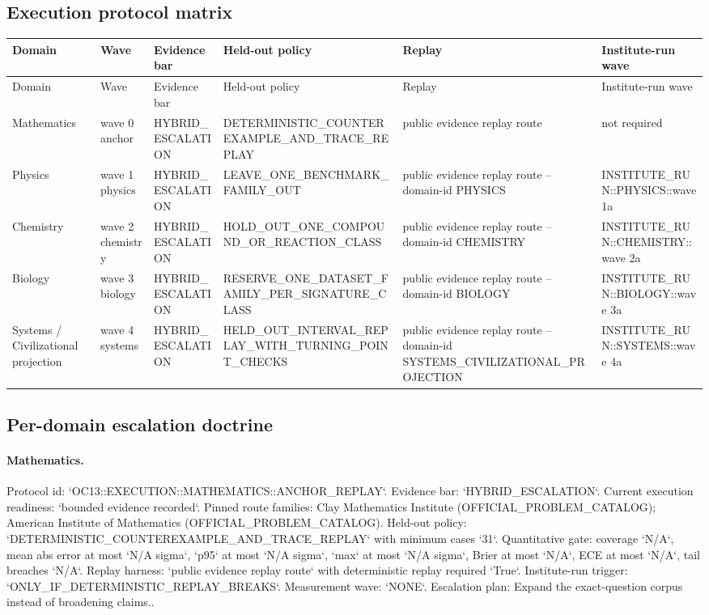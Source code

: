 \subsection{Execution protocol matrix}
\begin{longtable}{p{}p{}p{}p{}p{}p{}}
\toprule
Domain & Wave & Evidence bar & Held-out policy & Replay & Institute-run wave \\
\midrule
\endfirsthead
\toprule
Domain & Wave & Evidence bar & Held-out policy & Replay & Institute-run wave \\
\midrule
\endhead
Mathematics & wave 0 anchor & HYBRID\_ESCALATION & DETERMINISTIC\_COUNTEREXAMPLE\_AND\_TRACE\_REPLAY & public evidence replay route & not required \\
Physics & wave 1 physics & HYBRID\_ESCALATION & LEAVE\_ONE\_BENCHMARK\_FAMILY\_OUT & public evidence replay route --domain-id PHYSICS & INSTITUTE\_RUN::PHYSICS::wave 1a \\
Chemistry & wave 2 chemistry & HYBRID\_ESCALATION & HOLD\_OUT\_ONE\_COMPOUND\_OR\_REACTION\_CLASS & public evidence replay route --domain-id CHEMISTRY & INSTITUTE\_RUN::CHEMISTRY::wave 2a \\
Biology & wave 3 biology & HYBRID\_ESCALATION & RESERVE\_ONE\_DATASET\_FAMILY\_PER\_SIGNATURE\_CLASS & public evidence replay route --domain-id BIOLOGY & INSTITUTE\_RUN::BIOLOGY::wave 3a \\
Systems / Civilizational projection & wave 4 systems & HYBRID\_ESCALATION & HELD\_OUT\_INTERVAL\_REPLAY\_WITH\_TURNING\_POINT\_CHECKS & public evidence replay route --domain-id SYSTEMS\_CIVILIZATIONAL\_PROJECTION & INSTITUTE\_RUN::SYSTEMS::wave 4a \\
\bottomrule
\end{longtable}

\subsection{Per-domain escalation doctrine}
\paragraph{Mathematics.}
Protocol id: `OC13::EXECUTION::MATHEMATICS::ANCHOR\_REPLAY`. Evidence bar: `HYBRID\_ESCALATION`. Current execution readiness: `bounded evidence recorded`.
Pinned route families: Clay Mathematics Institute (OFFICIAL\_PROBLEM\_CATALOG); American Institute of Mathematics (OFFICIAL\_PROBLEM\_CATALOG).
Held-out policy: `DETERMINISTIC\_COUNTEREXAMPLE\_AND\_TRACE\_REPLAY` with minimum cases `31`.
Quantitative gate: coverage `N/A`, mean abs error at most `N/A sigma`, `p95` at most `N/A sigma`, `max` at most `N/A sigma`, Brier at most `N/A`, ECE at most `N/A`, tail breaches `N/A`.
Replay harness: `public evidence replay route` with deterministic replay required `True`.
Institute-run trigger: `ONLY\_IF\_DETERMINISTIC\_REPLAY\_BREAKS`. Measurement wave: `NONE`.
Escalation plan: Expand the exact-question corpus instead of broadening claims..

